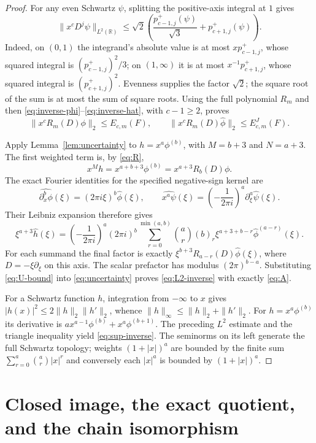 \documentclass[11pt]{article}
\newcommand{\R}{\mathbb R}
\begin{document}
\begin{proof}
For any even Schwartz $\psi$, splitting the positive-axis integral at
$1$ gives
\[
 \|x^cD^j\psi\|_{L^2(\R)}
 \leq\sqrt2\left(\frac{p^+_{c-1,j}(\psi)}{\sqrt3}
                               +p^+_{c+1,j}(\psi)\right).
\]
Indeed, on $(0,1)$ the integrand's absolute value is at most
$xp^+_{c-1,j}$, whose squared integral is $(p^+_{c-1,j})^2/3$;
on $(1,\infty)$ it is at most $x^{-1}p^+_{c+1,j}$, whose squared
integral is $(p^+_{c+1,j})^2$. Evenness supplies the factor $\sqrt2$;
the square root of the sum is at most the sum of square roots.
Using the full polynomial $R_m$ and then
\eqref{eq:inverse-phi}--\eqref{eq:inverse-hat}, with $c-1\geq2$, proves
\begin{equation}\label{eq:U-bound}
 \|x^cR_m(D)\phi\|_2\leq E_{c,m}(F),\qquad
 \|x^cR_m(D)\widehat\phi\|_2\leq E^J_{c,m}(F).
\end{equation}

Apply Lemma~\ref{lem:uncertainty} to
$h=x^a\phi^{(b)}$, with $M=b+3$ and $N=a+3$. The first weighted
term is, by \eqref{eq:R},
\[
 x^Mh=x^{a+b+3}\phi^{(b)}=x^{a+3}R_b(D)\phi.
\]
The exact Fourier identities for the specified negative-sign kernel are
\[
 \widehat{\partial_x^b\phi}(\xi)=(2\pi i\xi)^b\widehat\phi(\xi),
 \qquad
 \widehat{x^a\psi}(\xi)=\left(-\frac1{2\pi i}\right)^a
                                      \partial_\xi^a\widehat\psi(\xi).
\]
Their Leibniz expansion therefore gives
\[
 \xi^{a+3}\widehat h(\xi)
 =\left(-\frac1{2\pi i}\right)^a(2\pi i)^b
 \sum_{r=0}^{\min(a,b)}\binom ar(b)_r
       \xi^{a+3+b-r}\widehat\phi^{(a-r)}(\xi).
\]
For each summand the final factor is exactly
$\xi^{b+3}R_{a-r}(D)\widehat\phi(\xi)$, where
$D=-\xi\partial_\xi$ on this axis. The scalar prefactor has modulus
$(2\pi)^{b-a}$. Substituting \eqref{eq:U-bound} into
\eqref{eq:uncertainty} proves \eqref{eq:L2-inverse} with exactly
\eqref{eq:A}.

For a Schwartz function $h$, integration from $-\infty$ to $x$ gives
$|h(x)|^2\leq2\|h\|_2\|h'\|_2$, whence
$\|h\|_\infty\leq\|h\|_2+\|h'\|_2$.
For $h=x^a\phi^{(b)}$ its derivative is
$a x^{a-1}\phi^{(b)}+x^a\phi^{(b+1)}$. The preceding $L^2$ estimate
and the triangle inequality yield \eqref{eq:sup-inverse}. The
seminorms on its left generate the full Schwartz topology; weights
$(1+|x|)^a$ are bounded by the finite sum
$\sum_{r=0}^a\binom ar|x|^r$ and conversely each $|x|^a$ is bounded by
$(1+|x|)^a$.
\end{proof}

\section{Closed image, the exact quotient, and the chain isomorphism}
\end{document}
